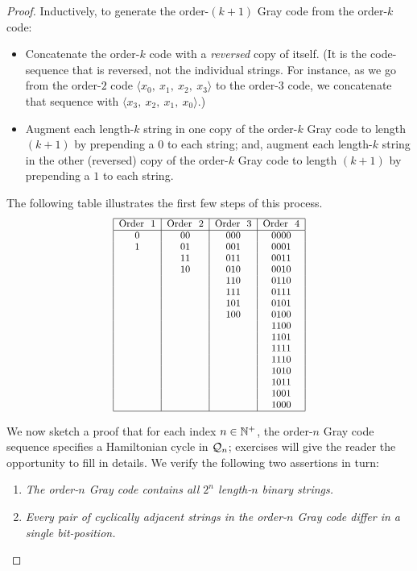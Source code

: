 \begin{proof}
Inductively, to generate the order-$(k+1)$ Gray code from the
order-$k$ code:
\begin{itemize}
\item
Concatenate the order-$k$ code with a {\em reversed} copy of itself.
(It is the code-sequence that is reversed, not the individual strings.
For instance, as we go from the order-$2$ code $\langle x_0, \ x_1,
\ x_2, \ x_3 \rangle$ to the order-$3$ code, we concatenate that
sequence with $\langle x_3, \ x_2, \ x_1, \ x_0 \rangle$.)
\item
Augment each length-$k$ string in one copy of the order-$k$ Gray code
to length $(k+1)$ by prepending a $0$ to each string; and, augment
each length-$k$ string in the other (reversed) copy of the order-$k$
Gray code to length $(k+1)$ by prepending a $1$ to each string.
\end{itemize}
The following table illustrates the first few steps of this process.
\begin{equation}
\label{eq:gray-code}
 {\small
\begin{array}{|c|c|c|c|}
\hline
\mbox{Order } \ 1
  & \mbox{Order } \ 2
  & \mbox{Order } \ 3
  & \mbox{Order } \ 4 \\
\hline
0   & 00   & 000  &  0000 \\ 
1   & 01   & 001  &  0001 \\
    & 11   & 011  &  0011 \\
    & 10   & 010  &  0010 \\
    &      & 110  &  0110 \\
    &      & 111  &  0111 \\
    &      & 101  &  0101 \\
    &      & 100  &  0100 \\
    &      &      &  1100 \\  
    &      &      &  1101 \\  
    &      &      &  1111 \\  
    &      &      &  1110 \\  
    &      &      &  1010 \\  
    &      &      &  1011 \\  
    &      &      &  1001 \\  
    &      &      &  1000 \\  
\hline
\end{array} }
\end{equation}

We now sketch a proof that for each index $n \in \mathbb{N}^+$, the order-$n$
Gray code sequence specifies a Hamiltonian cycle in $\mbox{$\cal Q$}_n$; exercises
will give the reader the opportunity to fill in details.  We verify
the following two assertions in turn:
\begin{enumerate}
\item
{\it The order-$n$ Gray code contains all $2^n$ length-$n$ binary
  strings.}
\item
{\it Every pair of cyclically adjacent strings in the order-$n$ Gray
  code differ in a single bit-position.}
\end{enumerate}


\end{proof}
